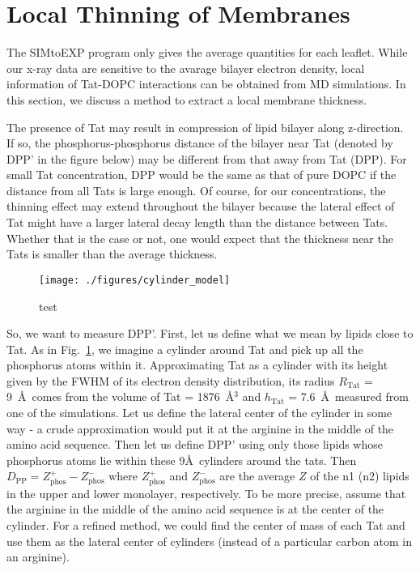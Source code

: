 \documentclass[12pt,letterpaper]{article}
\newcommand{\zphos}{Z_\mathrm{phos}}
\newcommand{\htat}{h_\mathrm{Tat}}
\begin{document}
\section{Local Thinning of Membranes}
The SIMtoEXP program only gives the average quantities for each leaflet. 
While our x-ray data are sensitive to the avarage bilayer electron density,
local information of Tat-DOPC interactions can be obtained from MD simulations.
In this section, we discuss a method to extract a local membrane thickness.

The presence of Tat may result in compression of lipid bilayer along z-direction. 
If so, the phosphorus-phosphorus distance of the bilayer near Tat (denoted by DPP'
in the figure below) may be different from that away from Tat (DPP).  For 
small Tat concentration, DPP would be the same as that of pure DOPC if the 
distance from all Tats is large enough.  Of course, for our concentrations, 
the thinning effect may extend throughout the bilayer because the lateral
effect of Tat might have a larger lateral decay length than the distance 
between Tats.  Whether that is the case or not, one would expect that the 
thickness near the Tats is smaller than the average thickness.

\begin{figure}[htbp]
  \centering
  \texttt{[image: ./figures/cylinder\_model]}
  \caption{test}
  \label{fig:cylinder_model}
\end{figure}
So, we want to measure DPP'.  First, let us define what we mean by lipids 
close to Tat.  As in Fig.~\ref{fig:cylinder_model}, we imagine a cylinder around Tat and 
pick up all the phosphorus atoms within it.  Approximating Tat as a cylinder 
with its height given by the FWHM of its electron density distribution, its 
radius $R_\mathrm{Tat}$ = 9~\AA\ comes from the volume of Tat = 1876~\AA$^3$ and 
$\htat$ = 7.6~\AA\
measured from one of the simulations. Let us define the lateral center of the 
cylinder in some way - a crude approximation would put it at the arginine in 
the middle of the amino acid sequence. Then let us define DPP' using only 
those lipids whose phosphorus atoms lie within these 9\AA\ cylinders around the 
tats. Then $D_\mathrm{PP} = \zphos^+ - \zphos^-$ where $\zphos^+$ and $\zphos^-$ 
are the 
average $Z$ of the n1 (n2) lipids in the upper and lower monolayer, respectively.  
To be more precise, assume that the arginine in the middle of the amino acid 
sequence is at the center of the cylinder. For a refined method, we could find 
the center of mass of each Tat and use them as the lateral center of cylinders 
(instead of a particular carbon atom in an arginine). 
\end{document}
